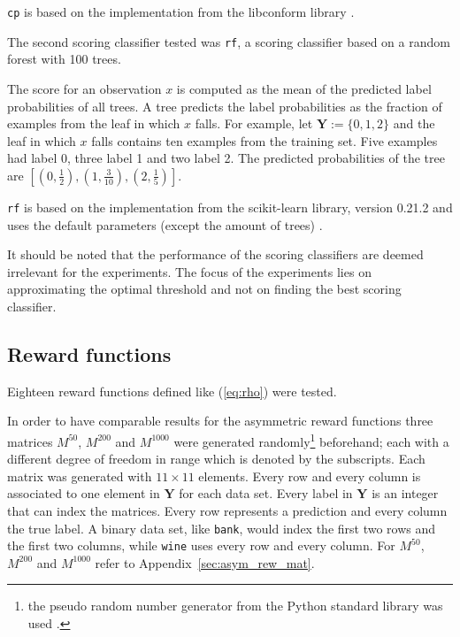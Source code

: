 \documentclass[twoside,11pt]{article}
\def\Y{\textbf{Y}}
\begin{document}
\texttt{cp} is based on the implementation from the
libconform library \citep[see][]{fassbender_2019}.

The second scoring classifier tested was \texttt{rf},
a scoring classifier based on a random forest with 100
trees.

The score for an observation $x$ is computed as the mean
of the predicted label probabilities of all trees.
A tree predicts the label probabilities as the fraction
of examples from the leaf in which $x$ falls.
For example, let $\Y := \{0,1,2\}$ and the leaf in which
$x$ falls contains ten examples from the training set.
Five examples had label 0, three label 1 and two label 2.
The predicted probabilities of the tree are
$[(0,\frac{1}{2}), (1,\frac{3}{10}), (2,\frac{1}{5})]$.

\texttt{rf} is based on the implementation from the
scikit-learn library, version 0.21.2 and uses the default
parameters (except the amount of trees)
\citep[see][]{sklearn_api}.

It should be noted that the performance of the scoring
classifiers are deemed irrelevant for the experiments.
The focus of the experiments lies on approximating the
optimal threshold and not on finding the best scoring
classifier.

\subsection{Reward functions}

Eighteen reward functions defined like (\ref{eq:rho}) were
tested.

In order to have comparable results for the asymmetric
reward functions three matrices $M^{50}$, $M^{200}$
and $M^{1000}$ were generated randomly\footnote{%
  the pseudo random number generator from the
  Python standard library was used
  \citep[see][Chapter 9.6]{python}.}
beforehand; each with a different degree of freedom in
range which is denoted by the subscripts.
Each matrix was generated with $11 \times 11$ elements.
Every row and every column is associated to one element
in $\Y$ for each data set.
Every label in $\Y$ is an integer that can index the
matrices.
Every row represents a prediction and every column the
true label.
A binary data set, like \texttt{bank}, would index the
first two rows and the first two columns, while
\texttt{wine} uses every row and every column.
For $M^{50}$, $M^{200}$ and $M^{1000}$ refer to
Appendix~\ref{sec:asym_rew_mat}.
\end{document}

